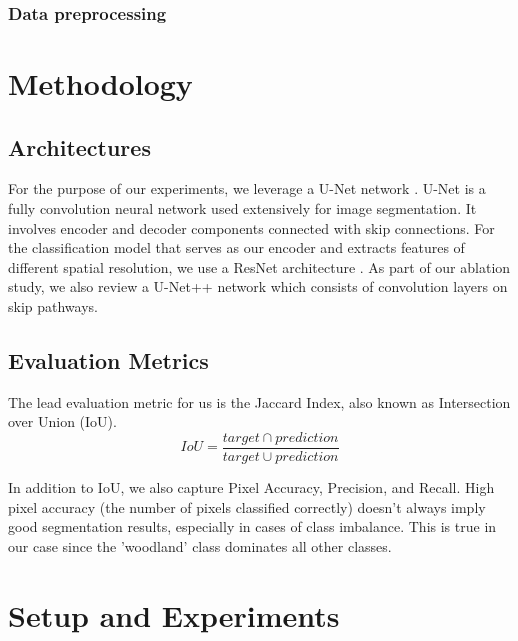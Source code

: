 \documentclass[conference]{IEEEtran}
\begin{document}
\subsubsection{Data preprocessing}


\section{Methodology}
\subsection{Architectures}

For the purpose of our experiments, we leverage a U-Net network \cite{ronneberger2015unet}. U-Net is a fully convolution neural network used extensively for image segmentation. It involves encoder and decoder components connected with skip connections. For the classification model that serves as our encoder and extracts features of different spatial resolution, we use a ResNet architecture \cite{DBLP:journals/corr/HeZRS15}. As part of our ablation study, we also review a U-Net++ network \cite{DBLP:journals/corr/abs-1807-10165} which consists of convolution layers on skip pathways.

\subsection{Evaluation Metrics}
 The lead evaluation metric for us is the Jaccard Index, also known as Intersection over Union (IoU).
\begin{equation*}
    IoU=\frac{target \cap prediction}{target \cup prediction}
\end{equation*}

In addition to IoU, we also capture Pixel Accuracy, Precision, and Recall. High pixel accuracy (the number of pixels classified correctly) doesn't always imply good segmentation results, especially in cases of class imbalance. This is true in our case since the 'woodland' class dominates all other classes.

\section{Setup and Experiments}
\end{document}
